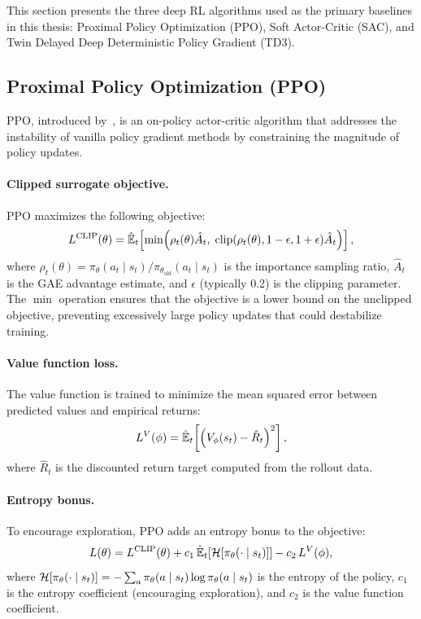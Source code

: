 This section presents the three deep RL algorithms used as the primary baselines in this thesis: Proximal Policy Optimization (PPO), Soft Actor-Critic (SAC), and Twin Delayed Deep Deterministic Policy Gradient (TD3).

\subsection{Proximal Policy Optimization (PPO)}
\label{sec:ppo}

PPO, introduced by~\citet{schulman2017ppo}, is an on-policy actor-critic algorithm that addresses the instability of vanilla policy gradient methods by constraining the magnitude of policy updates.

\paragraph{Clipped surrogate objective.} PPO maximizes the following objective:
\begin{equation}
    L^{\text{CLIP}}(\theta) = \hat{\mathbb{E}}_t\!\left[\min\!\left(\rho_t(\theta) \hat{A}_t, \; \operatorname{clip}(\rho_t(\theta), 1 - \epsilon, 1 + \epsilon) \hat{A}_t\right)\right],
    \label{eq:ppo_clip}
\end{equation}
where $\rho_t(\theta) = \pi_\theta(a_t \mid s_t) / \pi_{\theta_{\text{old}}}(a_t \mid s_t)$ is the importance sampling ratio, $\hat{A}_t$ is the GAE advantage estimate, and $\epsilon$ (typically 0.2) is the clipping parameter. The $\min$ operation ensures that the objective is a lower bound on the unclipped objective, preventing excessively large policy updates that could destabilize training.

\paragraph{Value function loss.} The value function is trained to minimize the mean squared error between predicted values and empirical returns:
\begin{equation}
    L^{V}(\phi) = \hat{\mathbb{E}}_t\!\left[\left(V_\phi(s_t) - \hat{R}_t\right)^2\right],
\end{equation}
where $\hat{R}_t$ is the discounted return target computed from the rollout data.

\paragraph{Entropy bonus.} To encourage exploration, PPO adds an entropy bonus to the objective:
\begin{equation}
    L(\theta) = L^{\text{CLIP}}(\theta) + c_1 \, \hat{\mathbb{E}}_t\!\left[\mathcal{H}[\pi_\theta(\cdot \mid s_t)]\right] - c_2 \, L^{V}(\phi),
    \label{eq:ppo_full}
\end{equation}
where $\mathcal{H}[\pi_\theta(\cdot \mid s_t)] = -\sum_a \pi_\theta(a \mid s_t) \log \pi_\theta(a \mid s_t)$ is the entropy of the policy, $c_1$ is the entropy coefficient (encouraging exploration), and $c_2$ is the value function coefficient.

